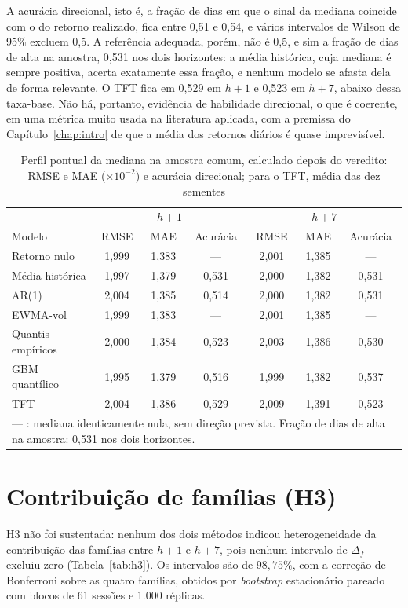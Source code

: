 A acurácia direcional, isto é, a fração de dias em que o sinal da mediana coincide com o do retorno realizado, fica entre 0,51 e 0,54, e vários intervalos de Wilson de 95\% excluem 0,5. A referência adequada, porém, não é 0,5, e sim a fração de dias de alta na amostra, 0,531 nos dois horizontes: a média histórica, cuja mediana é sempre positiva, acerta exatamente essa fração, e nenhum modelo se afasta dela de forma relevante. O TFT fica em 0,529 em \(h+1\) e 0,523 em \(h+7\), abaixo dessa taxa-base. Não há, portanto, evidência de habilidade direcional, o que é coerente, em uma métrica muito usada na literatura aplicada, com a premissa do Capítulo~\ref{chap:intro} de que a média dos retornos diários é quase imprevisível.

\begin{table}[htb]
\centering
\caption[Perfil pontual da mediana na amostra comum]{Perfil pontual da mediana na amostra comum, calculado depois do veredito: RMSE e MAE (\(\times 10^{-2}\)) e acurácia direcional; para o TFT, média das dez sementes}
\label{tab:pontual}
\small
\begin{tabular}{l c c c c c c}
\toprule
 & \multicolumn{3}{c}{\(h+1\)} & \multicolumn{3}{c}{\(h+7\)} \\
Modelo & RMSE & MAE & Acurácia & RMSE & MAE & Acurácia \\
\midrule
Retorno nulo & 1,999 & 1,383 & --- & 2,001 & 1,385 & --- \\
Média histórica & 1,997 & 1,379 & 0,531 & 2,000 & 1,382 & 0,531 \\
AR(1) & 2,004 & 1,385 & 0,514 & 2,000 & 1,382 & 0,531 \\
EWMA-vol & 1,999 & 1,383 & --- & 2,001 & 1,385 & --- \\
Quantis empíricos & 2,000 & 1,384 & 0,523 & 2,003 & 1,386 & 0,530 \\
GBM quantílico & 1,995 & 1,379 & 0,516 & 1,999 & 1,382 & 0,537 \\
TFT & 2,004 & 1,386 & 0,529 & 2,009 & 1,391 & 0,523 \\
\bottomrule
\multicolumn{7}{p{13cm}}{\footnotesize --- : mediana identicamente nula, sem direção prevista. Fração de dias de alta na amostra: 0,531 nos dois horizontes.}
\end{tabular}
\end{table}

\section{Contribuição de famílias (H3)} \label{sec:h3}
H3 não foi sustentada: nenhum dos dois métodos indicou heterogeneidade da contribuição das famílias entre \(h+1\) e \(h+7\), pois nenhum intervalo de \(\Delta_f\) excluiu zero (Tabela~\ref{tab:h3}). Os intervalos são de \(98{,}75\%\), com a correção de Bonferroni sobre as quatro famílias, obtidos por \textit{bootstrap} estacionário pareado com blocos de 61 sessões e 1.000 réplicas.

